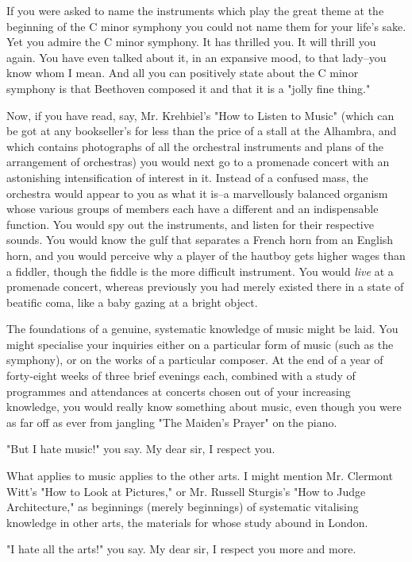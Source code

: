 If you were asked to name the instruments which play the great theme at
the beginning of the C minor symphony you could not name them for your
life's sake.  Yet you admire the C minor symphony.  It has thrilled
you.  It will thrill you again.  You have even talked about it, in an
expansive mood, to that lady--you know whom I mean.  And all you can
positively state about the C minor symphony is that Beethoven composed
it and that it is a "jolly fine thing."

Now, if you have read, say, Mr. Krehbiel's "How to Listen to Music"
(which can be got at any bookseller's for less than the price of a
stall at the Alhambra, and which contains photographs of all the
orchestral instruments and plans of the arrangement of orchestras) you
would next go to a promenade concert with an astonishing
intensification of interest in it.  Instead of a confused mass, the
orchestra would appear to you as what it is--a marvellously balanced
organism whose various groups of members each have a different and an
indispensable function.  You would spy out the instruments, and listen
for their respective sounds.  You would know the gulf that separates a
French horn from an English horn, and you would perceive why a player
of the hautboy gets higher wages than a fiddler, though the fiddle is
the more difficult instrument.  You would \textit{live} at a promenade
concert, whereas previously you had merely existed there in a state of
beatific coma, like a baby gazing at a bright object.

The foundations of a genuine, systematic knowledge of music might be
laid. You might specialise your inquiries either on a particular form
of music (such as the symphony), or on the works of a particular
composer.  At the end of a year of forty-eight weeks of three brief
evenings each, combined with a study of programmes and attendances at
concerts chosen out of your increasing knowledge, you would really know
something about music, even though you were as far off as ever from
jangling "The Maiden's Prayer" on the piano.

"But I hate music!" you say.  My dear sir, I respect you.

What applies to music applies to the other arts.  I might mention Mr.
Clermont Witt's "How to Look at Pictures," or Mr. Russell Sturgis's
"How to Judge Architecture," as beginnings (merely beginnings) of
systematic vitalising knowledge in other arts, the materials for whose
study abound in London.

"I hate all the arts!" you say.  My dear sir, I respect you more and
more.

